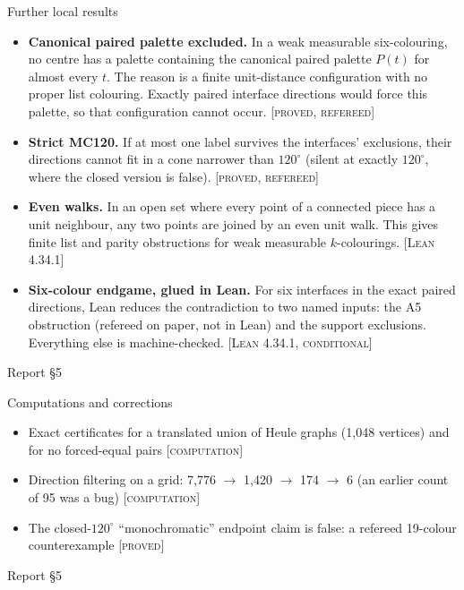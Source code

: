 \documentclass[aspectratio=169,11pt]{beamer}
\newcommand{\st}[1]{{\footnotesize\textsc{[#1]}}}
\newcommand{\src}[1]{\par\vfill{\scriptsize\color{gray} Report #1}}
\begin{document}
\begin{frame}{Further local results}
\begin{itemize}
\item \textbf{Canonical paired palette excluded.} In a weak measurable six-colouring, no centre has a palette containing the canonical paired palette $P(t)$ for almost every $t$. The reason is a finite unit-distance configuration with no proper list colouring. Exactly paired interface directions would force this palette, so that configuration cannot occur. \st{proved, refereed}
\item \textbf{Strict MC120.} If at most one label survives the interfaces' exclusions, their directions cannot fit in a cone narrower than $120^\circ$ (silent at exactly $120^\circ$, where the closed version is false). \st{proved, refereed}
\item \textbf{Even walks.} In an open set where every point of a connected piece has a unit neighbour, any two points are joined by an even unit walk. This gives finite list and parity obstructions for weak measurable $k$-colourings. \st{Lean 4.34.1}
\item \textbf{Six-colour endgame, glued in Lean.} For six interfaces in the exact paired directions, Lean reduces the contradiction to two named inputs: the A5 obstruction (refereed on paper, not in Lean) and the support exclusions. Everything else is machine-checked. \st{Lean 4.34.1, conditional}
\end{itemize}
\src{\S5}
\end{frame}

\begin{frame}{Computations and corrections}
\begin{itemize}
\item Exact certificates for a translated union of Heule graphs (1,048 vertices) and for no forced-equal pairs \st{computation}
\item Direction filtering on a grid: 7,776 $\to$ 1,420 $\to$ 174 $\to$ 6 (an earlier count of 95 was a bug) \st{computation}
\item The closed-$120^\circ$ ``monochromatic'' endpoint claim is false: a refereed 19-colour counterexample \st{proved}
\end{itemize}
\src{\S5}
\end{frame}
\end{document}
